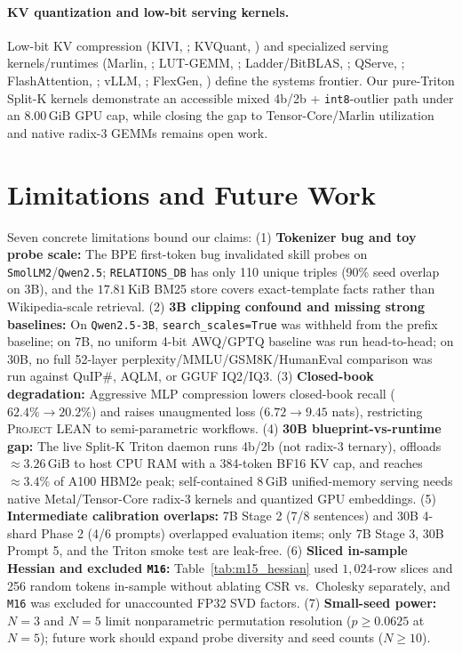 \documentclass[10pt]{article} %
\newcommand{\lean}{\textsc{Project LEAN}}
\begin{document}
\paragraph{KV quantization and low-bit serving kernels.}
Low-bit KV compression (KIVI, \citealp{liu2024kivi}; KVQuant, \citealp{hooper2024kvquant}) and specialized serving kernels/runtimes (Marlin, \citealp{frantar2025marlin}; LUT-GEMM, \citealp{park2024lutgemm}; Ladder/BitBLAS, \citealp{wang2024ladder}; QServe, \citealp{lin2025qserve}; FlashAttention, \citealp{dao2022flashattention}; vLLM, \citealp{kwon2023vllm}; FlexGen, \citealp{sheng2023flexgen}) define the systems frontier. Our pure-Triton Split-K kernels demonstrate an accessible mixed 4b/2b + \texttt{int8}-outlier path under an $8.00\,\text{GiB}$ GPU cap, while closing the gap to Tensor-Core/Marlin utilization and native radix-3 GEMMs remains open work.

\section{Limitations and Future Work}
\label{sec:limitations}

Seven concrete limitations bound our claims: (1) \textbf{Tokenizer bug and toy probe scale:} The BPE first-token bug invalidated skill probes on \texttt{SmolLM2}/\texttt{Qwen2.5}; \texttt{RELATIONS\_DB} has only 110 unique triples (90\% seed overlap on 3B), and the $17.81\,\text{KiB}$ BM25 store covers exact-template facts rather than Wikipedia-scale retrieval. (2) \textbf{3B clipping confound and missing strong baselines:} On \texttt{Qwen2.5-3B}, \texttt{search\_scales=True} was withheld from the prefix baseline; on 7B, no uniform 4-bit AWQ/GPTQ baseline was run head-to-head; on 30B, no full 52-layer perplexity/MMLU/GSM8K/HumanEval comparison was run against QuIP\#, AQLM, or GGUF IQ2/IQ3. (3) \textbf{Closed-book degradation:} Aggressive MLP compression lowers closed-book recall ($62.4\% \to 20.2\%$) and raises unaugmented loss ($6.72 \to 9.45$ nats), restricting \lean{} to semi-parametric workflows. (4) \textbf{30B blueprint-vs-runtime gap:} The live Split-K Triton daemon runs 4b/2b (not radix-3 ternary), offloads $\approx 3.26\,\text{GiB}$ to host CPU RAM with a 384-token BF16 KV cap, and reaches $\approx 3.4\%$ of A100 HBM2e peak; self-contained $8\,\text{GiB}$ unified-memory serving needs native Metal/Tensor-Core radix-3 kernels and quantized GPU embeddings. (5) \textbf{Intermediate calibration overlaps:} 7B Stage 2 (7/8 sentences) and 30B 4-shard Phase 2 (4/6 prompts) overlapped evaluation items; only 7B Stage 3, 30B Prompt 5, and the Triton smoke test are leak-free. (6) \textbf{Sliced in-sample Hessian and excluded \texttt{M16}:} Table~\ref{tab:m15_hessian} used $1{,}024$-row slices and 256 random tokens in-sample without ablating CSR vs.\ Cholesky separately, and \texttt{M16} was excluded for unaccounted FP32 SVD factors. (7) \textbf{Small-seed power:} $N=3$ and $N=5$ limit nonparametric permutation resolution ($p \ge 0.0625$ at $N=5$); future work should expand probe diversity and seed counts ($N \ge 10$).
\end{document}
